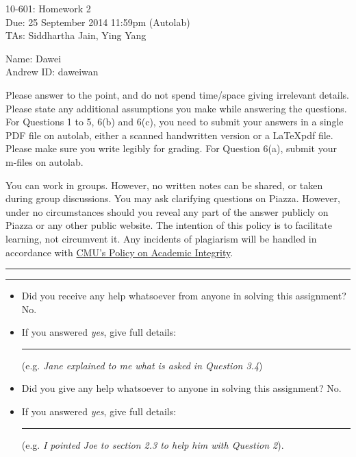 \documentclass[11pt]{article}
\newif\ifprint
\newcommand{\mycoursenum}{10-601}
\newcommand{\myhwnum}{2}
\newcommand{\myname}{Dawei}
\newcommand{\myandrew}{daweiwan}
\newcommand{\myfirstta}{Siddhartha Jain}
\newcommand{\mysecondta}{Ying Yang}
\newcommand{\question}[2] {\vspace{.25in} \hrule\vspace{0.5em} \noindent{\bf #1: #2} \vspace{0.5em} \hrule \vspace{.10in}}
\begin{document}
\medskip

\thispagestyle{plain}
\begin{center}
{\Large \mycoursenum: Homework \myhwnum} \\
Due: 25 September 2014 11:59pm (Autolab) \\
TAs: \myfirstta, \mysecondta \\
\medskip
\ifprint
Name: \myname \\
Andrew ID: \myandrew \\
\else
Name: \myname \\
Andrew ID: \myandrew \\
\fi
\end{center}

Please answer to the point, and do not spend time/space giving irrelevant details. 
Please state any additional assumptions you make while answering the questions. 
For Questions 1 to 5, 6(b) and 6(c), you need to submit your answers in a single PDF file on autolab, either a scanned handwritten version or a \LaTeX pdf file. 
Please make sure you write legibly for grading.
For Question 6(a), submit your m-files on autolab. 

You can work in groups. However, no written notes can be shared, or taken during group discussions. You may ask clarifying questions on Piazza. However, under no circumstances should you reveal any part of the answer publicly on Piazza or any other public website. The intention of this policy is to facilitate learning, not circumvent it. Any incidents of plagiarism will be handled in accordance with \href{http://www.cmu.edu/policies/documents/Academic%20Integrity.htm}{CMU's Policy on Academic Integrity}.


\question{$\star$}{Code of Conduct Declaration}

\begin{itemize}
	\item Did you receive any help whatsoever from anyone in solving this assignment? No.
	\item If you answered \emph{yes}, give full details: \rule{0.4\textwidth}{.4pt} (e.g. \emph{Jane explained to me what is asked in Question 3.4})
	\item Did you give any help whatsoever to anyone in solving this assignment? No.
	\item If you answered \emph{yes}, give full details: \rule{0.4\textwidth}{.4pt} (e.g. \emph{I pointed Joe to section 2.3 to help him with Question 2}).
\end{itemize}
\end{document}

